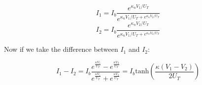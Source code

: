 \begin{equation}
    I_1 = I_b\frac{e^{\kappa_n V_1/U_T}}{e^{\kappa_n V_1/U_T + e^{\kappa_n V_2/U_T}}}
\end{equation}
\begin{equation}
    I_2 = I_b\frac{e^{\kappa_n V_2/U_T}}{e^{\kappa_n V_1/U_T + e^{\kappa_n V_2/U_T}}}
\end{equation}

Now if we take the difference between $I_1$ and $I_2$: 

\begin{equation}
    I_1 - I_2 = I_b\frac{e^{\frac{\kappa V_1}{U_T}} - e^{\frac{\kappa V_2}{U_T}}}{e^{\frac{\kappa V_1}{U_T}} + e^{\frac{\kappa V_2}{U_T}}} = I_b \mathrm{tanh}(\frac{\kappa (V_1 - V_2)}{2U_T}) 
\end{equation}


